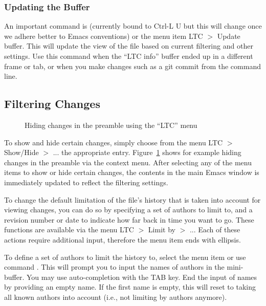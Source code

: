 \subsubsection{Updating the Buffer}

An important command is  (currently bound to Ctrl-L U but this will change once we adhere better to Emacs conventions) or the menu item LTC $>$ Update buffer.  This will update the  view of the file based on current filtering and other settings.  Use this command when the ``LTC info'' buffer ended up in a different frame or tab, or when you make changes such as a git commit from the command line.

\subsection{Filtering Changes}

\begin{figure}[t]
\centering
{}
\caption{Hiding changes in the preamble using the ``LTC'' menu} \label{fig:emacs-hide-preamble}
\end{figure}

To show and hide certain changes, simply choose from the menu LTC $>$ Show/Hide $>$ ... the appropriate entry.  Figure~\ref{fig:emacs-hide-preamble} shows for example hiding changes in the preamble via the context menu.  %
After selecting any of the menu items to show or hide certain changes, the contents in the main Emacs window is immediately updated to reflect the filtering settings.

To change the default limitation of the file's history that is taken into account for viewing changes, you can do so by specifying a set of authors to limit to, and a revision number or date to indicate how far back in time you want to go.  These functions are available via the menu LTC $>$ Limit by $>$ ...  Each of these actions require additional input, therefore the menu item ends with ellipsis. 

To define a set of authors to limit the history to, select the menu item or use command . This will prompt you to input the names of authors in the mini-buffer.  You may use auto-completion with the TAB key.  End the input of names by providing an empty name.  If the first name is empty, this will reset to taking all known authors into account (i.e., not limiting by authors anymore).

